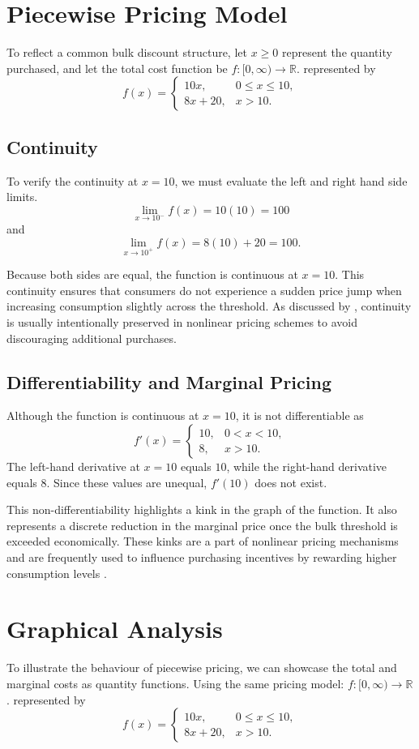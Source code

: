 \documentclass{article}
\begin{document}
\section{Piecewise Pricing Model}
To reflect a common bulk discount structure, let $x \ge 0$ represent the quantity purchased, and let the total cost function be
$f \colon [0,\infty) \to \mathbb{R}$. represented by
\[
f(x) =
\begin{cases}
10x, & 0 \le x \le 10, \\
8x + 20, & x > 10.
\end{cases}
\]
\subsection{Continuity}
To verify the continuity at $x=10$, we must evaluate the left and right hand side limits. 
\[
\lim_{x \to 10^-} f(x) = 10(10) = 100
\]
and
\[
\lim_{x \to 10^+} f(x) = 8(10) + 20 = 100.
\]

Because both sides are equal, the function is continuous at $x=10$. This continuity ensures that consumers do not experience a sudden price jump when increasing consumption slightly across the threshold. As discussed by \textcite{K2017}, continuity is usually intentionally preserved in nonlinear pricing schemes to avoid discouraging additional purchases.

\subsection{Differentiability and Marginal Pricing}
Although the function is continuous at $x=10$, it is not differentiable as 
\[
f'(x) =
\begin{cases}
10, & 0 < x < 10, \\
8,  & x > 10.
\end{cases}
\]
The left-hand derivative at $x=10$ equals $10$, while the right-hand derivative equals $8$. Since these values are unequal, $f'(10)$ does not exist.

This non-differentiability highlights a kink in the graph of the function. It also represents a discrete reduction in the marginal price once the bulk threshold is exceeded economically. These kinks are a part of nonlinear pricing mechanisms and are frequently used to influence purchasing incentives by rewarding higher consumption levels \textcite{radic2024}. 

\section{Graphical Analysis}
To illustrate the behaviour of piecewise pricing, we can showcase the total and marginal costs as quantity functions. Using the same pricing model: 
$f \colon [0,\infty) \to \mathbb{R}$. represented by
\[
f(x) =
\begin{cases}
10x, & 0 \le x \le 10, \\
8x + 20, & x > 10.
\end{cases}
\]
\end{document}
